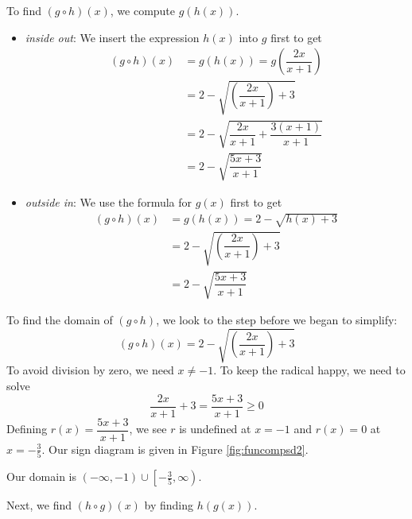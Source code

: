 {
To find $(g \circ h)(x)$, we compute $g(h(x))$. 

\begin{itemize}

\item  \textit{inside out}: We insert the expression $h(x)$ into $g$ first to get 
\begin{align*}
(g \circ h)(x) & = g(h(x)) = g\left(\dfrac{2x}{x+1}\right)\\
 & = 2 - \sqrt{\left(\dfrac{2x}{x+1}\right)+3}\\
 & = 2 - \sqrt{\dfrac{2x}{x+1} + \dfrac{3(x+1)}{x+1}} \tag*{get common denominators}\\ 
 & = 2 - \sqrt{\dfrac{5x+3}{x+1}}
 \end{align*}

\item  \textit{outside in}:  We use the formula for $g(x)$ first to get
\begin{align*}
(g \circ h)(x) & = g(h(x)) = 2 - \sqrt{h(x)+3} \\
  & = 2 - \sqrt{\left(\dfrac{2x}{x+1}\right)+3} \\ 
 & = 2 - \sqrt{\dfrac{5x+3}{x+1}} \tag*{get common denominators}
 \end{align*}

\end{itemize}

To find the domain of $(g \circ h)$, we look to the step before we began to simplify: \[(g \circ h)(x) = 2 - \sqrt{\left(\frac{2x}{x+1}\right)+3}\]  To avoid division by zero, we need $x \neq -1$. To keep the radical happy, we need to solve \[\frac{2x}{x+1} +3  = \frac{5x+3}{x+1}\geq 0\] Defining $r(x) = \dfrac{5x+3}{x+1}$, we see $r$ is undefined at $x=-1$ and $r(x) = 0$ at $x = -\frac{3}{5}$. Our sign diagram is given in Figure \ref{fig:funcompsd2}.


Our domain is $(-\infty, -1) \cup \left[-\frac{3}{5}, \infty\right)$.

\medskip


Next, we find $(h \circ g)(x)$ by finding $h(g(x))$.

}
